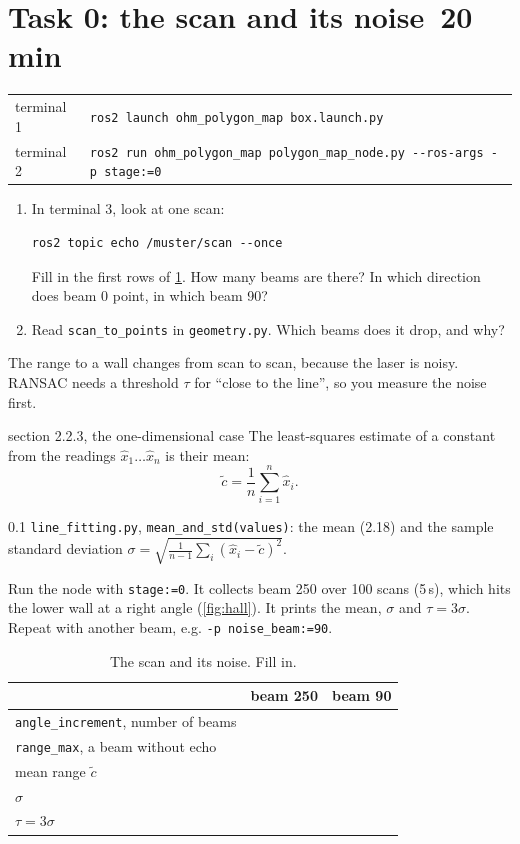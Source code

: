 \documentclass[11pt,a4paper,parskip=half]{scrartcl}
\makeatletter
\newcommand{\thema}[1]{\texttt{#1}}
\newcommand{\datei}[1]{\texttt{#1}}
\newcommand{\minutes}[1]{\hfill{\normalsize\mdseries\color{ohmgrey}\faClock[regular]~#1 min}}
\newcommand{\running}[2]{\begin{tcolorbox}[base, colback=black!3, borderline west={2.5pt}{0pt}{ohmgrey},
        title={\faTerminal~Running}, coltitle=ohmgrey, colbacktitle=black!3, fonttitle=\small\bfseries,
        toptitle=2pt, bottomtitle=0pt, fontupper=\small]
  \begin{tabularx}{\linewidth}{@{}>{\color{ohmgrey}}l >{\raggedright\arraybackslash}X@{}}
    terminal 1 & \texttt{ros2 launch ohm\_polygon\_map box.launch.py#1} \\
    terminal 2 & \texttt{ros2 run ohm\_polygon\_map polygon\_map\_node.py -\kern0pt-ros-args #2}
  \end{tabularx}
\end{tcolorbox}}
\makeatother
\begin{document}
\clearpage
\section{Task 0: the scan and its noise\minutes{20}}
\label{sec:task0}
\running{}{-p stage:=0}

\begin{enumerate}
  \item In terminal 3, look at one scan:
\begin{lstlisting}
ros2 topic echo /muster/scan --once
\end{lstlisting}
        Fill in the first rows of \cref{tab:noise}. How many beams are there? In which direction does
        beam 0 point, in which beam 90?
  \item Read \thema{scan\_to\_points} in \datei{geometry.py}. Which beams does it drop, and why?
\end{enumerate}

The range to a wall changes from scan to scan, because the laser is noisy. RANSAC needs a threshold
\(\tau\) for ``close to the line'', so you measure the noise first.

\begin{script}{section 2.2.3, the one-dimensional case}
The least-squares estimate of a constant from the readings \(\hat x_1 \dots \hat x_n\) is their mean:
\begin{equation}
  \tilde c = \frac 1n \sum_{i=1}^n \hat x_i .
  \tag{2.18}
\end{equation}
\end{script}

\begin{todo}{0.1}
\datei{line\_fitting.py}, \thema{mean\_and\_std(values)}: the mean (2.18) and the sample standard
deviation \(\sigma = \sqrt{\frac{1}{n-1}\sum_i (\hat x_i - \tilde c)^2}\).
\end{todo}

Run the node with \thema{stage:=0}. It collects beam 250 over 100 scans (5\,s), which hits the lower wall
at a right angle (\cref{fig:hall}). It prints the mean, \(\sigma\) and \(\tau = 3\sigma\). Repeat with
another beam, e.g. \thema{-p noise\_beam:=90}.

\begin{table}[ht]\centering
\renewcommand{\arraystretch}{1.8}
\caption{The scan and its noise. Fill in.}
\label{tab:noise}
\begin{tabular}{@{}>{\raggedright\arraybackslash}p{6.2cm}p{3.2cm}p{3.2cm}@{}}
\toprule
& beam 250 & beam 90 \\
\midrule
\thema{angle\_increment}, number of beams & \multicolumn{2}{l}{} \\
\thema{range\_max}, a beam without echo & \multicolumn{2}{l}{} \\
mean range \(\tilde c\) & & \\
\(\sigma\) & & \\
\(\tau = 3\sigma\) & & \\
\bottomrule
\end{tabular}
\end{table}
\end{document}
